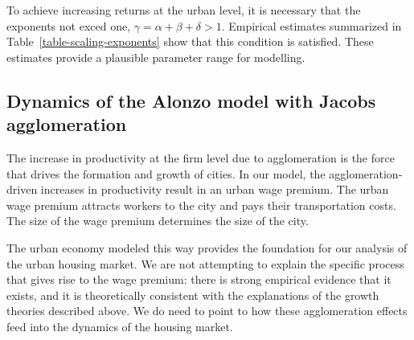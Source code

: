 {\begin{table}[htb]
\end{table}


To achieve increasing returns at the urban level, it is necessary that the exponents not exced one, $\gamma=\alpha+ \beta + \delta > 1$.  Empirical  estimates summarized in Table~\ref{table-scaling-exponents} show that this condition is satisfied. These estimates provide a plausible parameter range for modelling. 


% 
% 
\subsection{Dynamics of the Alonzo model with Jacobs agglomeration}
The increase in productivity at the firm level due to agglomeration is the force that drives the formation and growth of cities. In our model, the agglomeration-driven increases in productivity result in an \gls{urban wage premium}. The urban wage premium attracts workers to the city and pays their transportation costs. The size of the wage premium determines the size of the city.

The urban economy modeled this way provides the foundation for our analysis of the urban housing market. We are not attempting to explain the specific process that gives rise to the wage premium: there is strong empirical evidence that it exists, and it is theoretically consistent with the explanations of the growth theories described above. We do need to point to how these agglomeration effects feed into the dynamics of the housing market.


}
